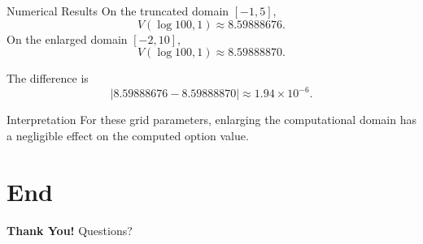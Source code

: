 \documentclass{beamer}
\begin{document}
\begin{frame}{Numerical Results}
On the truncated domain \([-1,5]\),
\[
V(\log 100,1)\approx 8.59888676.
\]
On the enlarged domain \([-2,10]\),
\[
V(\log 100,1)\approx 8.59888870.
\]

The difference is
\[
\left|
8.59888676-8.59888870
\right|
\approx
1.94\times10^{-6}.
\]

\begin{block}{Interpretation}
For these grid parameters, enlarging the computational domain has
a negligible effect on the computed option value.
\end{block}

\end{frame}




\section*{End}

\begin{frame}{}
\centering
\vfill
{\Huge\color{blue!70!black}\textbf{Thank You!}}
\vspace{1cm}
{\Large Questions?}
\vfill
\end{frame}
\end{document}
